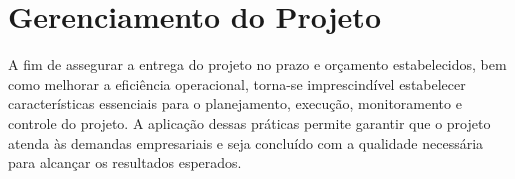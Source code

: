 \chapter{Gerenciamento do Projeto}

A fim de assegurar a entrega do projeto no prazo e orçamento estabelecidos, bem como melhorar a eficiência operacional, torna-se imprescindível estabelecer características essenciais para o planejamento, execução, monitoramento e controle do projeto. A aplicação dessas práticas permite garantir que o projeto atenda às demandas empresariais e seja concluído com a qualidade necessária para alcançar os resultados esperados.





